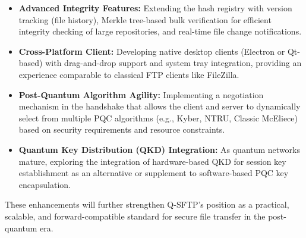 \begin{itemize}
    \item \textbf{Advanced Integrity Features:} Extending the hash registry with version tracking (file history), Merkle tree-based bulk verification for efficient integrity checking of large repositories, and real-time file change notifications.
    
    \item \textbf{Cross-Platform Client:} Developing native desktop clients (Electron or Qt-based) with drag-and-drop support and system tray integration, providing an experience comparable to classical FTP clients like FileZilla.
    
    \item \textbf{Post-Quantum Algorithm Agility:} Implementing a negotiation mechanism in the handshake that allows the client and server to dynamically select from multiple PQC algorithms (e.g., Kyber, NTRU, Classic McEliece) based on security requirements and resource constraints.
    
    \item \textbf{Quantum Key Distribution (QKD) Integration:} As quantum networks mature, exploring the integration of hardware-based QKD for session key establishment as an alternative or supplement to software-based PQC key encapsulation.
\end{itemize}

These enhancements will further strengthen Q-SFTP's position as a practical, scalable, and forward-compatible standard for secure file transfer in the post-quantum era.
